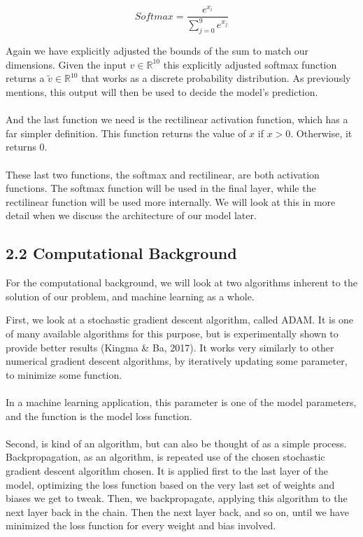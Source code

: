 \documentclass{article}
\begin{document}
\[Softmax = \frac{e^{x_i}}{\sum_{j=0}^9 e^{x_j}}\]

Again we have explicitly adjusted the bounds of the sum to match our dimensions. Given the input $v\in \mathbb{R}^{10}$ this explicitly adjusted softmax function returns a $\tilde v \in \mathbb{R}^{10}$ that works as a discrete probability distribution. As previously mentions, this output will then be used to decide the model's prediction.\\\\

And the last function we need is the rectilinear activation function, which has a far simpler definition. This function returns the value of $x$ if $x > 0$. Otherwise, it returns $0$.\\\\

These last two functions, the softmax and rectilinear, are both activation functions. The softmax function will be used in the final layer, while the rectilinear function will be used more internally. We will look at this in more detail when we discuss the architecture of our model later.

\subsection*{2.2 Computational Background}

For the computational background, we will look at two algorithms inherent to the solution of our problem, and machine learning as a whole.

First, we look at a stochastic gradient descent algorithm, called ADAM. It is one of many available algorithms for this purpose, but is experimentally shown to provide better results (Kingma \& Ba, 2017). It works very similarly to other numerical gradient descent algorithms, by iteratively updating some parameter, to minimize some function.\\\\

In a machine learning application, this parameter is one of the model parameters, and the function is the model loss function.\\\\

Second, is kind of an algorithm, but can also be thought of as a simple process. Backpropagation, as an algorithm, is repeated use of the chosen stochastic gradient descent algorithm chosen. It is applied first to the last layer of the model, optimizing the loss function based on the very last set of weights and biases we get to tweak. Then, we backpropagate, applying this algorithm to the next layer back in the chain. Then the next layer back, and so on, until we have minimized the loss function for every weight and bias involved.\\\\
\end{document}
